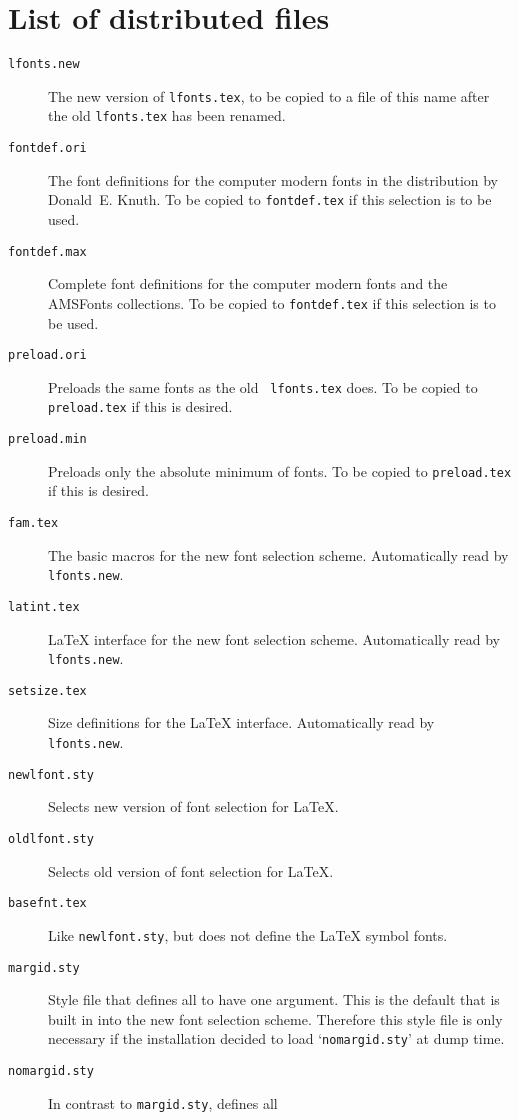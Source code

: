  \section{List of distributed files}
 
 \begin{description}
  \item[\tt lfonts.new]
   The new version of {\tt lfonts.tex}, to be copied to a file of
   this name after the old {\tt lfonts.tex} has been renamed.
  \item[\tt fontdef.ori]
   The font definitions for the computer modern fonts in the
   distribution by
   Donald~E. Knuth.  To be copied to {\tt fontdef.tex} if this
   selection is to be used.
  \item[\tt fontdef.max]
   Complete font definitions for the computer modern fonts and the
   AMSFonts collections.  To be copied to {\tt fontdef.tex} if this
   selection is to be used.
  \item[\tt preload.ori]
   Preloads the same fonts as the old {\tt
   lfonts.tex} does.  To be copied
   to {\tt preload.tex} if this is desired.
  \item[\tt preload.min]
   Preloads only the absolute minimum of fonts.  To be copied
   to {\tt preload.tex} if this is desired.
  \item[\tt fam.tex]
   The basic macros for the new font selection scheme.
   Automatically read by {\tt lfonts.new}.
  \item[\tt latint.tex]
   \LaTeX{} interface for the new font selection scheme.
   Automatically read by {\tt lfonts.new}.
  \item[\tt setsize.tex]
   Size definitions for the \LaTeX{} interface.
   Automatically read by {\tt lfonts.new}.
  \item[\tt newlfont.sty]
   Selects new version of font selection for \LaTeX.
  \item[\tt oldlfont.sty]
   Selects old version of font selection for \LaTeX.
  \item[\tt basefnt.tex]
   Like {\tt newlfont.sty}, but does not define the \LaTeX{} symbol
   fonts.
  \item[\tt margid.sty]
   Style file that
   defines all  to have one argument.
   This is the default that is built in into the new font selection
   scheme.  Therefore this style file is only necessary if the
   installation decided to load `{\tt nomargid.sty}' at dump time.
  \item[\tt nomargid.sty]
   In contrast to {\tt margid.sty}, defines all

\end{description}
